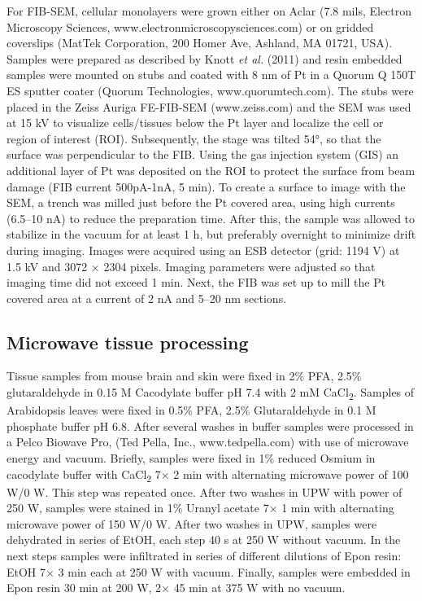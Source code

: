 \documentclass{article}
\begin{document}
For FIB-SEM, cellular monolayers were grown either on Aclar (7.8 mils, Electron Microscopy Sciences, www.electronmicroscopysciences.com) or on gridded coverslips (MatTek Corporation, 200 Homer Ave, Ashland, MA 01721, USA). Samples were prepared as described by Knott \textit{et al.} (2011) and resin embedded samples were mounted on stubs and coated with 8 nm of Pt in a Quorum Q 150T ES sputter coater (Quorum Technologies, www.quorumtech.com). The stubs were placed in the Zeiss Auriga FE-FIB-SEM (www.zeiss.com) and the SEM was used at 15 kV to visualize cells/tissues below the Pt layer and localize the cell or region of interest (ROI). Subsequently, the stage was tilted 54°, so that the surface was perpendicular to the FIB. Using the gas injection system (GIS) an additional layer of Pt was deposited on the ROI to protect the surface from beam damage (FIB current 500pA-1nA, 5 min). To create a surface to image with the SEM, a trench was milled just before the Pt covered area, using high currents (6.5–10 nA) to reduce the preparation time. After this, the sample was allowed to stabilize in the vacuum for at least 1 h, but preferably overnight to minimize drift during imaging. Images were acquired using an ESB detector (grid: 1194 V) at 1.5 kV and 3072 × 2304 pixels. Imaging parameters were adjusted so that imaging time did not exceed 1 min. Next, the FIB was set up to mill the Pt covered area at a current of 2 nA and 5–20 nm sections.

\subsection*{Microwave tissue processing}

Tissue samples from mouse brain and skin were fixed in 2\% PFA, 2.5\% glutaraldehyde in 0.15 M Cacodylate buffer pH 7.4 with 2 mM CaCl\textsubscript{2}. Samples of Arabidopsis leaves were fixed in 0.5\% PFA, 2.5\% Glutaraldehyde in 0.1 M phosphate buffer pH 6.8. After several washes in buffer samples were processed in a Pelco Biowave Pro, (Ted Pella, Inc., www.tedpella.com) with use of microwave energy and vacuum. Briefly, samples were fixed in 1\% reduced Osmium in cacodylate buffer with CaCl\textsubscript{2} 7× 2 min with alternating microwave power of 100 W/0 W. This step was repeated once. After two washes in UPW with power of 250 W, samples were stained in 1\% Uranyl acetate 7× 1 min with alternating microwave power of 150 W/0 W. After two washes in UPW, samples were dehydrated in series of EtOH, each step 40 s at 250 W without vacuum. In the next steps samples were infiltrated in series of different dilutions of Epon resin: EtOH 7× 3 min each at 250 W with vacuum. Finally, samples were embedded in Epon resin 30 min at 200 W, 2× 45 min at 375 W with no vacuum.
\end{document}
